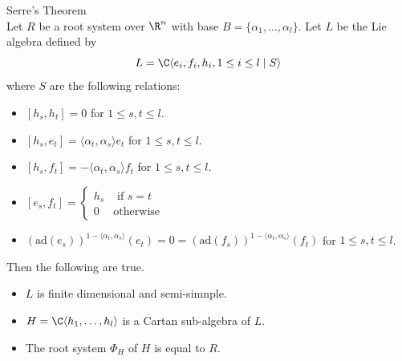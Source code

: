 \documentclass[a4paper]{article}
\begin{document}
\begin{thm}{Serre's Theorem}{} \\Let $R$ be a root system over $\R^n$ with base $B=\{\alpha_1,\dots,\alpha_l\}$. Let $L$ be the Lie algebra defined by $$L=\C\langle e_i,f_i,h_i, 1\leq i\leq l\;|\;S\rangle$$ where $S$ are the following relations: 
\begin{itemize}
\item $[h_s,h_t]=0$ for $1\leq s,t\leq l$. 
\item $[h_s,e_t]=\langle\alpha_t,\alpha_s\rangle e_t$ for $1\leq s,t\leq l$. 
\item $[h_s,f_t]=-\langle\alpha_t,\alpha_s\rangle f_t$ for $1\leq s,t\leq l$. 
\item $[e_s,f_t]=\begin{cases}
h_s & \text{ if } s=t\\
0 & \text{otherwise}
\end{cases}$
\item $\left(\text{ad}(e_s)\right)^{1-\langle\alpha_t,\alpha_s\rangle}(e_t)=0=\left(\text{ad}(f_s)\right)^{1-\langle\alpha_t,\alpha_s\rangle}(f_t)$ for $1\leq s,t\leq l$. 
\end{itemize}
Then the following are true. 
\begin{itemize}
\item $L$ is finite dimensional and semi-simnple. 
\item $H=\C\langle h_1,\dots,h_l\rangle$ is a Cartan sub-algebra of $L$. 
\item The root system $\Phi_H$ of $H$ is equal to $R$. 
\end{itemize}
\end{thm}
\end{document}
